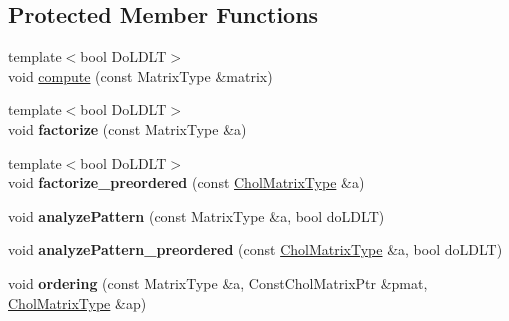 \subsection*{Protected Member Functions}
\begin{DoxyCompactItemize}
\item 
{\footnotesize template$<$bool Do\+L\+D\+LT$>$ }\\void \mbox{\hyperlink{class_eigen_1_1_simplicial_cholesky_base_a9a741744dda2261cae26cddf96a35bf0}{compute}} (const Matrix\+Type \&matrix)
\item 
\mbox{\label{class_eigen_1_1_simplicial_cholesky_base_ad62e844358aa1f5b69690e069f9354c9}} 
{\footnotesize template$<$bool Do\+L\+D\+LT$>$ }\\void {\bfseries factorize} (const Matrix\+Type \&a)
\item 
\mbox{\label{class_eigen_1_1_simplicial_cholesky_base_a340f5bfbe509aad506ebda8d9877d918}} 
{\footnotesize template$<$bool Do\+L\+D\+LT$>$ }\\void {\bfseries factorize\+\_\+preordered} (const \mbox{\hyperlink{class_eigen_1_1_sparse_matrix}{Chol\+Matrix\+Type}} \&a)
\item 
\mbox{\label{class_eigen_1_1_simplicial_cholesky_base_aaf20ed812a661069f9e484649ae9be1e}} 
void {\bfseries analyze\+Pattern} (const Matrix\+Type \&a, bool do\+L\+D\+LT)
\item 
\mbox{\label{class_eigen_1_1_simplicial_cholesky_base_ac2acafc9b7cdc089f89b6777e7469b73}} 
void {\bfseries analyze\+Pattern\+\_\+preordered} (const \mbox{\hyperlink{class_eigen_1_1_sparse_matrix}{Chol\+Matrix\+Type}} \&a, bool do\+L\+D\+LT)
\item 
\mbox{\label{class_eigen_1_1_simplicial_cholesky_base_a4e59a8081d09fd8ff1ce9db4becbc150}} 
void {\bfseries ordering} (const Matrix\+Type \&a, Const\+Chol\+Matrix\+Ptr \&pmat, \mbox{\hyperlink{class_eigen_1_1_sparse_matrix}{Chol\+Matrix\+Type}} \&ap)
\end{DoxyCompactItemize}
